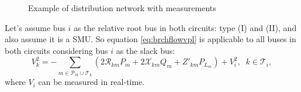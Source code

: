 \documentclass{article}
\begin{document}
\begin{figure}[t]
    \centering
    \quad
    \caption{Example of distribution network with measurements}
    \label{fig:vgrdnt}
\end{figure}

Let's assume bus $i$ as the relative root bus in both circuits: type (I) and (II), and also assume it is a SMU. So equation \eqref{eq:brchflowvpl} is applicable to all buses in both circuits considering bus $i$ as the slack bus: 
\begin{equation}
    V_k^2 =-\sum_{m\in\mathcal {P}_{ik}\cup \mathcal{T}_k} (2\mathcal{R}_{km}P_m+ 2\mathcal{X}_{km}Q_m+Z'_{km} P_{L_m})+V_i^2,\;\;k\in\mathcal{T}_i,\label{eq:vkr}
\end{equation}
where $V_i$ can be measured in real-time.
\end{document}
